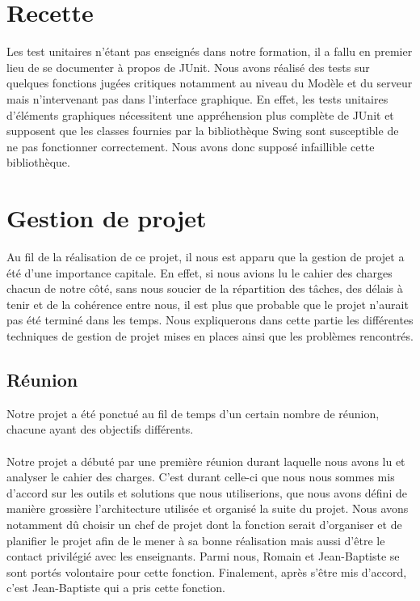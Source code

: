 \documentclass[a4paper,11pt]{article}
\begin{document}
\section{Recette}

Les test unitaires n'\'etant pas enseign\'es dans notre formation, il a fallu en premier lieu de se documenter \`a propos de JUnit. Nous avons r\'ealis\'e des tests sur quelques fonctions jugées critiques notamment au niveau du Modèle et du serveur mais n'intervenant pas dans l'interface graphique. En effet, les tests unitaires d'\'el\'ements graphiques n\'ecessitent une appr\'ehension plus compl\`ete de JUnit et supposent que les classes fournies par la biblioth\`eque Swing sont susceptible de ne pas fonctionner correctement. Nous avons donc suppos\'e infaillible cette biblioth\`eque.

\section{Gestion de projet}
Au fil de la réalisation de ce projet, il nous est apparu que la gestion de projet a été d'une importance capitale. En effet, si nous avions lu le cahier des charges chacun de notre côté, sans nous soucier de la répartition des tâches, des délais à tenir et de la cohérence entre nous, il est plus que probable que le projet n'aurait pas été terminé dans les temps. Nous expliquerons dans cette partie les différentes techniques de gestion de projet mises en places ainsi que les problèmes rencontrés.

\subsection{Réunion}
Notre projet a été ponctué au fil de temps d'un certain nombre de réunion, chacune ayant des objectifs différents.

\paragraph{} Notre projet a débuté par une première réunion durant laquelle nous avons lu et analyser le cahier des charges. C'est durant celle-ci que nous nous sommes mis d'accord sur les outils et solutions que nous utiliserions, que nous avons défini de manière grossière l'architecture utilisée et organisé la suite du projet. Nous avons notamment dû choisir un chef de projet dont la fonction serait d'organiser et de planifier le projet afin de le mener à sa bonne réalisation mais aussi d'être le contact privilégié avec les enseignants. Parmi nous, Romain et Jean-Baptiste se sont portés volontaire pour cette fonction. Finalement, après s'être mis d'accord, c'est Jean-Baptiste qui a pris cette fonction.
\end{document}

